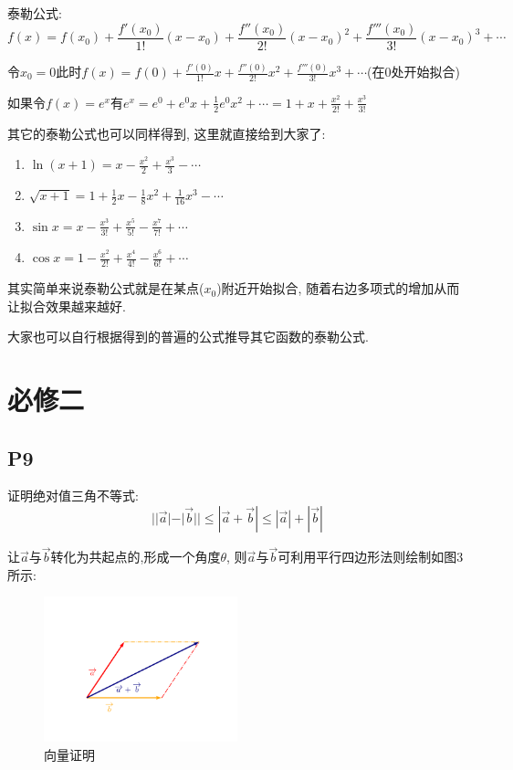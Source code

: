 \documentclass{book}
\begin{document}
    \textcolor[rgb]{0.38,0.11,0.2}{泰勒公式:} $$f(x)=f(x_0)+\frac{f'(x_0)}{1!}(x-x_0)+\frac{f''(x_0)}{2!}(x-x_0)^2+\frac{f'''(x_0)}{3!}(x-x_0)^3+\cdots$$

    令$x_0=0$此时$\displaystyle f(x)=f(0)+\frac{f'(0)}{1!}x+\frac{f''(0)}{2!}x^2+\frac{f'''(0)}{3!}x^3+\cdots$(在0处开始拟合)

    如果令$\displaystyle f(x)=e^x$有$\displaystyle e^x=e^0+e^0x+\frac{1}{2}e^0x^2+\cdots=1+x+\frac{x^2}{2!}+\frac{x^3}{3!}$

    其它的泰勒公式也可以同样得到, 这里就直接给到大家了:

    \begin{enumerate}
        \item $\displaystyle \ln (x+1)=x-\frac{x^2}{2}+\frac{x^3}{3}-\cdots$
        \item $\displaystyle \sqrt{x+1}=1+\frac{1}{2}x-\frac{1}{8}x^2+\frac{1}{16}x^3-\cdots$
        \item $\displaystyle \sin x = x-\frac{x^3}{3!}+\frac{x^5}{5!}-\frac{x^7}{7!}+\cdots$
        \item $\displaystyle \cos x=1-\frac{x^2}{2!}+\frac{x^4}{4!}-\frac{x^6}{6!}+\cdots$
    \end{enumerate}

    其实简单来说泰勒公式就是在某点($x_0$)附近开始拟合, 随着右边多项式的增加从而让拟合效果越来越好.

    大家也可以自行根据得到的普遍的公式推导其它函数的泰勒公式.
    \chapter{必修二}
    \section{\textcolor[rgb]{0.11,0.65,0.52}{P9}}
    \begin{boxB}
        证明\textcolor[rgb]{0.38,0.11,0.2}{绝对值三角不等式}: $$
        ||\overrightarrow{a}|-|\overrightarrow{b}||\le|\overrightarrow{a}+\overrightarrow{b}|\le|\overrightarrow{a}|+|\overrightarrow{b}|
        $$
    \end{boxB}

    让$\overrightarrow{a}$与$\overrightarrow{b}$转化为共起点的,形成一个角度$\theta$, 则$\overrightarrow{a}$与$\overrightarrow{b}$可利用平行四边形法则绘制如图3所示:
    \begin{figure}[htbp]
        \centering
        \includegraphics[width=0.5\textwidth]{img/vector.png}
        \caption{向量证明}
    \end{figure}
\end{document}
